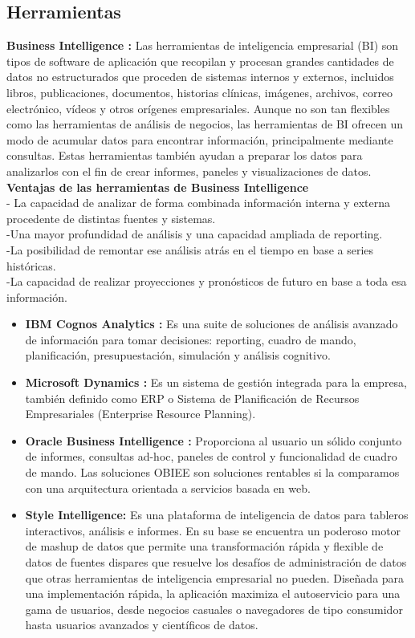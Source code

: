 \documentclass[%
 reprint,
 amsmath,amssymb,
 aps,
]{revtex4-1}
\begin{document}
\subsection{Herramientas}
\textbf{Business Intelligence :}
Las herramientas de inteligencia empresarial (BI) son tipos de software de aplicación que recopilan y procesan grandes cantidades de datos no estructurados que proceden de sistemas internos y externos, incluidos libros, publicaciones, documentos, historias clínicas, imágenes, archivos, correo electrónico, vídeos y otros orígenes empresariales. Aunque no son tan flexibles como las herramientas de análisis de negocios, las herramientas de BI ofrecen un modo de acumular datos para encontrar información, principalmente mediante consultas. Estas herramientas también ayudan a preparar los datos para analizarlos con el fin de crear informes, paneles y visualizaciones de datos.\\
\textbf{ Ventajas de las herramientas de Business Intelligence}\\
- La capacidad de analizar de forma combinada información interna y externa procedente de distintas fuentes y sistemas.\\
-Una mayor profundidad de análisis y una capacidad ampliada de reporting.\\
-La posibilidad de remontar ese análisis atrás en el tiempo en base a series históricas.\\
-La capacidad de realizar proyecciones y pronósticos de futuro en base a toda esa información.\\
\begin{itemize}
\item \textbf{IBM Cognos Analytics :}
Es una suite de soluciones de análisis avanzado de información para tomar decisiones: reporting, cuadro de mando, planificación, presupuestación, simulación y análisis cognitivo.
\item \textbf{Microsoft Dynamics :}
Es un sistema de gestión integrada para la empresa, también definido como ERP o Sistema de Planificación de Recursos Empresariales (Enterprise Resource Planning).
\item \textbf{Oracle Business Intelligence :}
Proporciona al usuario un sólido conjunto de informes, consultas ad-hoc, paneles de control y funcionalidad de cuadro de mando. Las soluciones OBIEE son soluciones rentables si la comparamos con una arquitectura orientada a servicios basada en web.
\item \textbf{Style Intelligence:}
Es una plataforma de inteligencia de datos para tableros interactivos, análisis e informes. En su base se encuentra un poderoso motor de mashup de datos que permite una transformación rápida y flexible de datos de fuentes dispares que resuelve los desafíos de administración de datos que otras herramientas de inteligencia empresarial no pueden. Diseñada para una implementación rápida, la aplicación maximiza el autoservicio para una gama de usuarios, desde negocios casuales o navegadores de tipo consumidor hasta usuarios avanzados y científicos de datos.

	\end{itemize} 
\end{document}
